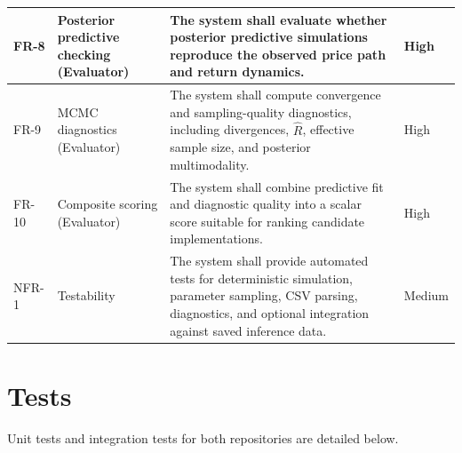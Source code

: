 \documentclass[11pt]{report}
\begin{document}
{\begin{longtable}{|L{0.09\textwidth}|L{0.14\textwidth}|L{0.42\textwidth}|L{0.20\textwidth}|}
  \hline
  FR-8 & Posterior predictive checking (Evaluator) &
  The system shall evaluate whether posterior predictive simulations reproduce the observed price path
  and return dynamics. &
  High \\
  \hline
  FR-9 & MCMC diagnostics (Evaluator) &
  The system shall compute convergence and sampling-quality diagnostics, including divergences, $
  \widehat{R}$, effective sample size, and posterior multimodality. &
  High \\
  \hline
  FR-10 & Composite scoring (Evaluator) &
  The system shall combine predictive fit and diagnostic quality into a scalar score suitable for ranking
  candidate implementations. &
  High \\
  \hline
  NFR-1 & Testability &
  The system shall provide automated tests for deterministic simulation, parameter sampling, CSV parsing,
  diagnostics, and optional integration against saved inference data. &
  Medium \\
  \hline
\end{longtable}
}

\section{Tests}\label{apex:tests}
Unit tests and integration tests for
both repositories are detailed below.

\end{document}
